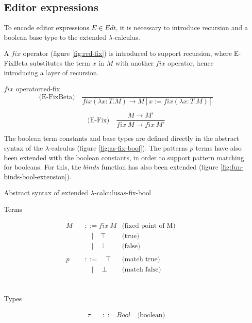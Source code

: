 \subsection{Editor expressions}
To encode editor expressions $E \in Edt$, it is necessary to introduce recursion and a boolean base type to the extended $\lambda$-calculus.

A $fix$ operator (figure \ref{fig:red-fix}) is introduced to support recursion, where E-FixBeta substitutes the term $x$ in $M$ with another $fix$ operator, hence introducing a layer of recursion.

\begin{myfigure}{$fix$ operator}{red-fix}
    \[
        \text{(E-FixBeta)} \quad \frac{}{fix(\lambda x : T.M) \rightarrow M[x := fix(\lambda x : T.M)]}
    \]

    \[
        \text{(E-Fix)} \quad \frac{M \rightarrow M'}{fix \ M \rightarrow fix \ M'}
    \]
\end{myfigure}


The boolean term constants and base types are defined directly in the abstract syntax of the $\lambda$-calculus (figure \ref{fig:as-fix-bool}). The patterns $p$ terms have also been extended with the boolean constants, in order to support pattern matching for booleans. For this, the $binds$ function has also been extended (figure \ref{fig:fun-binds-bool-extension}).

\begin{myfigure}{Abstract syntax of extended $\lambda$-calculus}{as-fix-bool}
    \begin{center}
        Terms
    \end{center}
    \[
        \begin{aligned}
            M \quad & ::= fix \ M          & \text{(fixed point of M)} &  & \\
                    & \quad | \quad \top   & \text{(true)}             &  & \\
                    & \quad | \quad \bot   & \text{(false)}            &  & \\
            \\
            p \quad & ::= \quad \top       & \text{(match true)}       &  & \\
                    & \quad | \quad \ \bot & \text{(match false)}      &  & \\
        \end{aligned}
    \]
    \\
    \begin{center}
        Types
    \end{center}
    \[
        \begin{aligned}
            \tau \quad & ::= Bool \quad \text{(boolean)}
        \end{aligned}
    \]
\end{myfigure}

